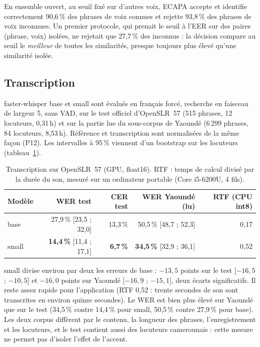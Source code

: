 En ensemble ouvert, au seuil fixé sur d'autres voix, ECAPA accepte et identifie correctement
90,6\,\% des phrases de voix connues et rejette 93,8\,\% des phrases de voix inconnues. Un
premier protocole, qui prenait le seuil à l'EER sur des paires (phrase, voix) isolées, ne
rejetait que 27,7\,\% des inconnus : la décision compare au seuil le \emph{meilleur} de toutes
les similarités, presque toujours plus élevé qu'une similarité isolée.

\subsection{Transcription}
\label{sec:res-wer}

faster-whisper base et small sont évalués en français forcé, recherche en faisceau de largeur 5,
sans VAD, sur le test officiel d'OpenSLR~57 (515 phrases, 12 locuteurs, 0,31\,h) et sur la partie
lue du sous-corpus de Yaoundé (6\,299 phrases, 84 locuteurs, 8,53\,h). Référence et transcription
sont normalisées de la même façon (P12). Les intervalles à 95\,\% viennent d'un bootstrap sur les
locuteurs (tableau~\ref{tab:wer}).

\begin{table}[ht]
  \centering
  \small
  \begin{tabular}{@{}lrrrr@{}}
    \toprule
    Modèle & WER test & CER test & WER Yaoundé (lu) & RTF (CPU int8) \\
    \midrule
    base  & 27,9\,\% [23,5 ; 32,0] & 13,3\,\% & 50,5\,\% [48,7 ; 52,3] & 0,17 \\
    small & \textbf{14,4\,\%} [11,4 ; 17,1] & \textbf{6,7\,\%} & \textbf{34,5\,\%} [32,9 ; 36,1] & 0,52 \\
    \bottomrule
  \end{tabular}
  \caption{Transcription sur OpenSLR~57 (GPU, float16). RTF : temps de calcul divisé par la
    durée du son, mesuré sur un ordinateur portable (Core i5-6200U, 4 fils).}
  \label{tab:wer}
\end{table}

small divise environ par deux les erreurs de base : $-13{,}5$ points sur le test
[$-16{,}5$ ; $-10{,}5$] et $-16{,}0$ points sur Yaoundé [$-16{,}9$ ; $-15{,}1$], deux écarts
significatifs. Il reste
assez rapide pour l'application (RTF 0,52 : trente secondes de son sont transcrites en environ
quinze secondes). Le WER est bien plus élevé sur Yaoundé que sur le test (34,5\,\% contre
14,4\,\% pour small, 50,5\,\% contre 27,9\,\% pour base). Les deux corpus diffèrent par le
contenu, la longueur des phrases, l'enregistrement et les locuteurs, et le test contient aussi
des locuteurs camerounais : cette mesure ne permet pas d'isoler l'effet de l'accent.

